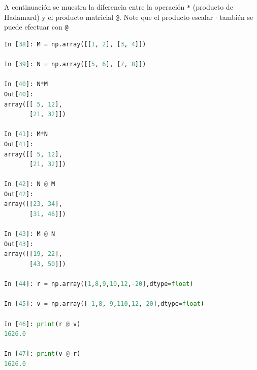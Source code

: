 \documentclass[12pt]{article}
\begin{document}
A continuación se muestra la diferencia entre la operación \lstinline|*| 
(producto de Hadamard) y el producto matricial
\lstinline|@|. 
Note que el producto escalar $\cdot$ también se puede efectuar con \lstinline|@|
%
\begin{lstlisting}[language=Python]
In [38]: M = np.array([[1, 2], [3, 4]])

In [39]: N = np.array([[5, 6], [7, 8]])

In [40]: N*M
Out[40]: 
array([[ 5, 12],
       [21, 32]])

In [41]: M*N
Out[41]: 
array([[ 5, 12],
       [21, 32]])

In [42]: N @ M
Out[42]: 
array([[23, 34],
       [31, 46]])

In [43]: M @ N
Out[43]: 
array([[19, 22],
       [43, 50]])

In [44]: r = np.array([1,8,9,10,12,-20],dtype=float)

In [45]: v = np.array([-1,8,-9,110,12,-20],dtype=float)

In [46]: print(r @ v)
1626.0

In [47]: print(v @ r)
1626.0       
\end{lstlisting}
% 
\end{document}

